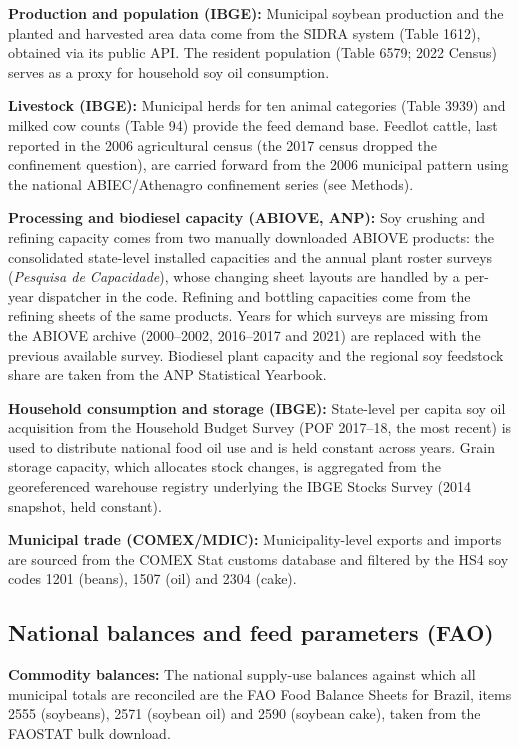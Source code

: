 \documentclass[pdflatex,sn-nature]{sn-jnl}%
\begin{document}
\textbf{Production and population (IBGE):} Municipal soybean production and the planted and harvested area data come from the SIDRA system (Table 1612), obtained via its public API. The resident population (Table 6579; 2022 Census) serves as a proxy for household soy oil consumption.

\textbf{Livestock (IBGE):} Municipal herds for ten animal categories (Table 3939) and milked cow counts (Table 94) provide the feed demand base. Feedlot cattle, last reported in the 2006 agricultural census (the 2017 census dropped the confinement question), are carried forward from the 2006 municipal pattern using the national ABIEC/Athenagro confinement series (see Methods).

\textbf{Processing and biodiesel capacity (ABIOVE, ANP):} Soy crushing and
refining capacity comes from two manually downloaded ABIOVE products: the
consolidated state-level installed capacities and the annual plant roster
surveys (\emph{Pesquisa de Capacidade}), whose changing sheet layouts are
handled by a per-year dispatcher in the code. Refining and bottling
capacities come from the refining sheets of the same products. Years for which surveys are missing from the ABIOVE archive (2000–2002, 2016–2017 and 2021) are replaced with the previous available survey. Biodiesel plant capacity and the regional soy feedstock share are taken from the ANP Statistical Yearbook.

\textbf{Household consumption and storage (IBGE):} State-level per capita soy oil acquisition from the Household Budget Survey (POF 2017–18, the most recent) is used to distribute national food oil use and is held constant across years. Grain storage capacity, which allocates stock changes, is aggregated from the georeferenced warehouse registry underlying the IBGE Stocks Survey (2014 snapshot, held constant).

\textbf{Municipal trade (COMEX/MDIC):} Municipality-level exports and imports are sourced from the COMEX Stat customs database and filtered by the HS4 soy codes 1201 (beans), 1507 (oil) and 2304 (cake).

\subsection{National balances and feed parameters (FAO)}\label{subsec:fao}

\textbf{Commodity balances:} The national supply-use balances against which all municipal totals are reconciled are the FAO Food Balance Sheets for Brazil, items 2555 (soybeans), 2571 (soybean oil) and 2590 (soybean cake), taken from the FAOSTAT bulk download.
\end{document}
